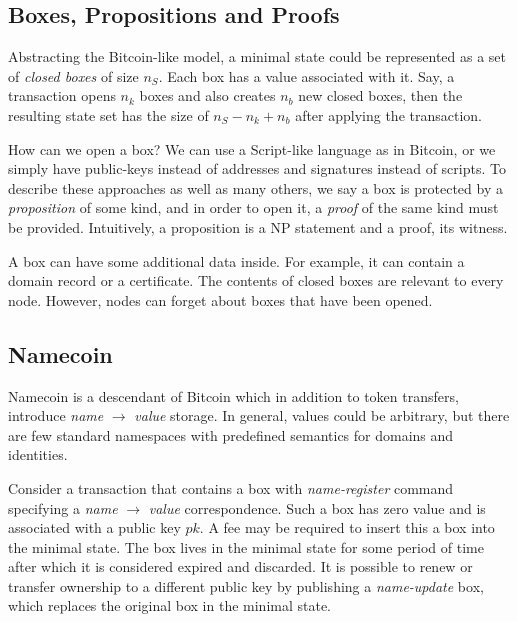 \documentclass[]{report}   %
\begin{document}
%

\subsection{Boxes, Propositions and Proofs}

Abstracting the Bitcoin-like model, a minimal state could be represented as a set of \textit{closed boxes} of size \(n_S\). Each box has a value associated with it. Say, a transaction opens \(n_k\) boxes and also creates \(n_b\) new closed boxes, then the resulting state set has the size of \(n_S-n_k+n_b\) after applying the transaction. 

How can we open a box? 
We can use a Script-like language as in Bitcoin, or we simply have public-keys instead of addresses and signatures instead of scripts. To describe these approaches as well as many others, we say a box is protected by a \textit{proposition} of some kind, and in order to open it, a \textit{proof} of the same kind must be provided. %
Intuitively, a proposition is a NP statement and a proof, its witness.

A box can have some additional data inside. For example, it can contain a domain record or a certificate. The contents of closed boxes are relevant to every node. However, nodes can forget about boxes that have been opened.

\subsection{Namecoin}

Namecoin is a descendant of Bitcoin which in addition to token transfers, introduce \textit{name} $\rightarrow$ \textit{value} storage. In general, values could be arbitrary, but there are few  standard namespaces with predefined semantics for domains and identities.

Consider a transaction that contains a box with {\em name-register} command specifying a \textit{name} $\rightarrow$ \textit{value} correspondence. Such a box has zero value and is associated with a public key \(pk\). A fee may be required to insert this a box into the minimal state. The box lives in the minimal state for some period of time after which it is considered expired and discarded. It is possible to renew or transfer ownership to a different public key by publishing a \textit{name-update} box, which replaces the original box in the minimal state.
\end{document}
